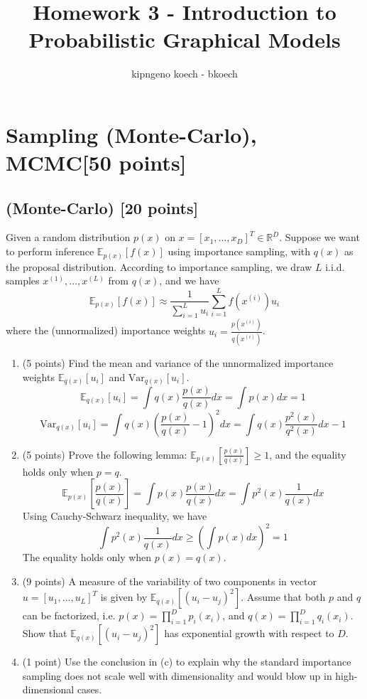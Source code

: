 \documentclass{article}
\author{kipngeno koech - bkoech}
\title{Homework 3 - Introduction to Probabilistic Graphical Models}
\date{}
\begin{document}
\maketitle

\section{Sampling (Monte-Carlo), MCMC[50 points]}

\subsection{(Monte-Carlo) [20 points]}

Given a random distribution $p(x)$ on $x = [x_1, ..., x_D]^T \in \mathbb{R}^D$. Suppose we want to perform inference
$\mathbb{E}_{p(x)}[f(x)]$ using importance sampling, with $q(x)$ as the proposal distribution. According to importance
sampling, we draw $L$ i.i.d. samples $x^{(1)}, ..., x^{(L)}$ from $q(x)$, and we have
$$\mathbb{E}_{p(x)}[f(x)] \approx \frac{1}{\sum_{i=1}^L u_i} \sum_{i=1}^L f(x^{(i)})u_i$$
where the (unnormalized) importance weights $u_i = \frac{p(x^{(i)})}{q(x^{(i)})}$.

\begin{enumerate}
\item (5 points) Find the mean and variance of the unnormalized importance weights $\mathbb{E}_{q(x)}[u_i]$ and $\mathrm{Var}_{q(x)}[u_i]$.
\[
\mathbb{E}_{q(x)}[u_i] = \int q(x) \frac{p(x)}{q(x)} dx = \int p(x) dx = 1
\]
\[
\mathrm{Var}_{q(x)}[u_i] = \int q(x) \left(\frac{p(x)}{q(x)} - 1\right)^2 dx = \int q(x) \frac{p^2(x)}{q^2(x)} dx - 1
\]

\item (5 points) Prove the following lemma: $\mathbb{E}_{p(x)}\left[\frac{p(x)}{q(x)}\right] \geq 1$, and the equality holds only when $p = q$.
\[
\mathbb{E}_{p(x)}\left[\frac{p(x)}{q(x)}\right] = \int p(x) \frac{p(x)}{q(x)} dx = \int p^2(x) \frac{1}{q(x)} dx
\]
Using Cauchy-Schwarz inequality, we have
\[
\int p^2(x) \frac{1}{q(x)} dx \geq \left(\int p(x) dx\right)^2 = 1
\]
The equality holds only when $p(x) = q(x)$.
\item (9 points) A measure of the variability of two components in vector $u = [u_1, ..., u_L]^T$ is given by
$\mathbb{E}_{q(x)}\left[(u_i - u_j)^2\right]$. Assume that both $p$ and $q$ can be factorized, i.e. $p(x) = \prod_{i=1}^D p_i(x_i)$, and $q(x) = \prod_{i=1}^D q_i(x_i)$. Show that $\mathbb{E}_{q(x)}\left[(u_i - u_j)^2\right]$ has exponential growth with respect to $D$.
\[\]
\item (1 point) Use the conclusion in (c) to explain why the standard importance sampling does not scale well
with dimensionality and would blow up in high-dimensional cases.
\end{enumerate}
\end{document}
